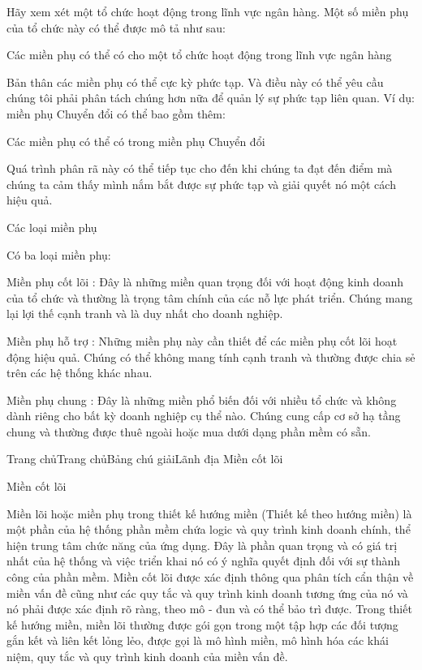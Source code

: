 Hãy xem xét một tổ chức hoạt động trong lĩnh vực ngân hàng. Một số miền phụ của tổ chức này có thể được mô tả như sau:

Các miền phụ có thể có cho một tổ chức hoạt động trong lĩnh vực ngân hàng

Bản thân các miền phụ có thể cực kỳ phức tạp. Và điều này có thể yêu cầu chúng tôi phải phân tách chúng hơn nữa để quản lý sự phức tạp liên quan. Ví dụ: miền phụ Chuyển đổi có thể bao gồm thêm:

Các miền phụ có thể có trong miền phụ Chuyển đổi

Quá trình phân rã này có thể tiếp tục cho đến khi chúng ta đạt đến điểm mà chúng ta cảm thấy mình nắm bắt được sự phức tạp và giải quyết nó một cách hiệu quả.

Các loại miền phụ

Có ba loại miền phụ:

Miền phụ cốt lõi : Đây là những miền quan trọng đối với hoạt động kinh doanh của tổ chức và thường là trọng tâm chính của các nỗ lực phát triển. Chúng mang lại lợi thế cạnh tranh và là duy nhất cho doanh nghiệp.

Miền phụ hỗ trợ : Những miền phụ này cần thiết để các miền phụ cốt lõi hoạt động hiệu quả. Chúng có thể không mang tính cạnh tranh và thường được chia sẻ trên các hệ thống khác nhau.

Miền phụ chung : Đây là những miền phổ biến đối với nhiều tổ chức và không dành riêng cho bất kỳ doanh nghiệp cụ thể nào. Chúng cung cấp cơ sở hạ tầng chung và thường được thuê ngoài hoặc mua dưới dạng phần mềm có sẵn.






Trang chủTrang chủBảng chú giảiLãnh địa Miền cốt lõi

Miền cốt lõi

Miền lõi hoặc miền phụ trong thiết kế hướng miền (Thiết kế theo hướng miền) là một phần của hệ thống phần mềm chứa logic và quy trình kinh doanh chính, thể hiện trung tâm chức năng của ứng dụng. Đây là phần quan trọng và có giá trị nhất của hệ thống và việc triển khai nó có ý nghĩa quyết định đối với sự thành công của phần mềm. Miền cốt lõi được xác định thông qua phân tích cẩn thận về miền vấn đề cũng như các quy tắc và quy trình kinh doanh tương ứng của nó và nó phải được xác định rõ ràng, theo mô - đun và có thể bảo trì được. Trong thiết kế hướng miền, miền lõi thường được gói gọn trong một tập hợp các đối tượng gắn kết và liên kết lỏng lẻo, được gọi là mô hình miền, mô hình hóa các khái niệm, quy tắc và quy trình kinh doanh của miền vấn đề.

